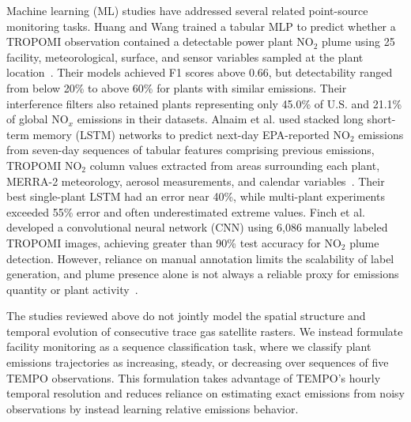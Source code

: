 \documentclass[sigconf,nonacm]{acmart}
\newcommand{\NOx}{NO$_x$}
\begin{document}
Machine learning (ML) studies have addressed several related point-source monitoring
tasks. Huang and Wang trained a tabular MLP to predict whether a TROPOMI observation
contained a detectable power plant NO$_2$ plume using 25 facility, meteorological,
surface, and sensor variables sampled at the plant location~\cite{huang2026detectability}.
Their models achieved F1 scores above 0.66, but detectability
ranged from below 20\% to above 60\% for plants with similar emissions. Their
interference filters also retained plants representing only 45.0\% of U.S. and 21.1\%
of global \NOx{} emissions in their datasets. Alnaim et al. used stacked long
short-term memory (LSTM) networks to predict next-day EPA-reported NO$_2$ emissions from seven-day sequences of tabular features comprising previous emissions,
TROPOMI NO$_2$ column values extracted from areas surrounding each plant,
MERRA-2 meteorology, aerosol measurements, and calendar variables~\cite{alnaim2022evaluating}. Their best single-plant LSTM
had an error near 40\%, while multi-plant experiments exceeded 55\% error and
often underestimated extreme values. Finch et al. developed a convolutional neural
network (CNN) using 6,086 manually labeled TROPOMI images, achieving greater than
90\% test accuracy for NO$_2$ plume detection. However, reliance on manual
annotation limits the scalability of label generation, and plume presence alone is not always a reliable proxy for emissions quantity
or plant activity~\cite{finch2022automated}.

The studies reviewed above do not jointly model the spatial structure and temporal
evolution of consecutive trace gas satellite rasters. We instead formulate facility
monitoring as a sequence classification task, where we classify plant emissions
trajectories as increasing, steady, or decreasing over sequences of five TEMPO
observations. This formulation takes advantage of TEMPO's hourly temporal resolution
and reduces reliance on estimating exact emissions from noisy observations
by instead learning relative emissions behavior.
\end{document}
